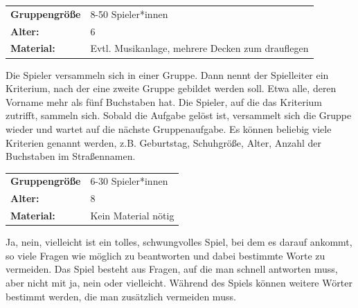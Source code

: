 \begin{table}[H]
\begin{tabular}{>{\bfseries}lp{8cm}}
   Gruppengröße   & 8-50 Spieler*innen\\
    Alter: & 6 \\
    Material: & 
Evtl. Musikanlage, mehrere Decken zum drauflegen \\
\end{tabular}
\end{table} 

Die Spieler versammeln sich in einer Gruppe. Dann nennt der Spielleiter ein Kriterium, nach der eine zweite Gruppe gebildet werden soll. Etwa alle, deren Vorname mehr als fünf Buchstaben hat. Die Spieler, auf die das Kriterium zutrifft, sammeln sich. Sobald die Aufgabe gelöst ist, versammelt sich die Gruppe wieder und wartet auf die nächste Gruppenaufgabe. Es können beliebig viele Kriterien genannt werden, z.B. Geburtstag, Schuhgröße, Alter, Anzahl der Buchstaben im Straßennamen. \\

\newpage

\begin{table}[H]
\begin{tabular}{>{\bfseries}lp{8cm}}
   Gruppengröße   & 6-30 Spieler*innen\\
    Alter: & 8 \\
    Material: & Kein Material nötig \\
\end{tabular}
\end{table} 

 Ja, nein, vielleicht ist ein tolles, schwungvolles Spiel, bei dem es darauf ankommt, so viele Fragen wie möglich zu beantworten und dabei bestimmte Worte zu vermeiden. Das Spiel besteht aus Fragen, auf die man schnell antworten muss, aber nicht mit ja, nein oder vielleicht. Während des Spiels können weitere Wörter bestimmt werden, die man zusätzlich vermeiden muss. \\



